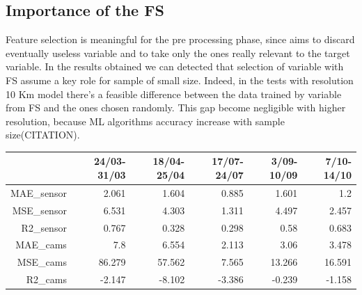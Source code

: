 \subsection{Importance of the FS}
Feature selection is meaningful for the pre processing phase, since aims to discard eventually useless variable and to take only the ones really relevant to the target variable. In the results obtained we can detected that selection of variable with FS assume a key role for sample of small size. 
Indeed, in the tests with resolution 10 Km model there's a feasible difference between the data trained by variable from FS and the ones chosen randomly. 
This gap become negligible with higher resolution, because ML algorithms accuracy increase with sample size(CITATION).
\begin{tabular}{rrrrrr}
\hline
          &   24/03-31/03 &   18/04-25/04 &   17/07-24/07 &   3/09-10/09 &   7/10-14/10 \\
\hline
   MAE\_sensor &         2.061 &         1.604 &         0.885 &        1.601 &        1.2   \\
    MSE\_sensor &         6.531 &         4.303 &         1.311 &        4.497 &        2.457 \\
    R2\_sensor  &         0.767 &         0.328 &         0.298 &        0.58  &        0.683 \\
    MAE\_cams   &         7.8   &         6.554 &         2.113 &        3.06  &        3.478 \\
    MSE\_cams   &        86.279 &        57.562 &         7.565 &       13.266 &       16.591 \\
    R2\_cams    &        -2.147 &        -8.102 &        -3.386 &       -0.239 &       -1.158 \\
\hline
\end{tabular}

